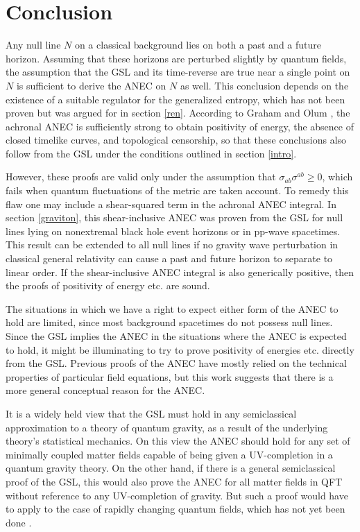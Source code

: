 \documentclass[11pt]{article}
\begin{document}
\section{Conclusion}\label{con}

Any null line $N$ on a classical background lies on both a past and a future horizon.  Assuming that these horizons are perturbed slightly by quantum fields, the assumption that the GSL and its time-reverse are true near a single point on $N$ is sufficient to derive the ANEC on $N$ as well.  This conclusion depends on the existence of a suitable regulator for the generalized entropy, which has not been proven but was argued for in section \ref{ren}.  According to Graham and Olum \cite{GO07}, the achronal ANEC is sufficiently strong to obtain positivity of energy, the absence of closed timelike curves, and topological censorship, so that these conclusions also follow from the GSL under the conditions outlined in section \ref{intro}. 

However, these proofs are valid only under the assumption that $\sigma_{ab}\sigma^{ab} \ge 0$, which fails when quantum fluctuations of the metric are taken account.  To remedy this flaw one may include a shear-squared term in the achronal ANEC integral.  In section \ref{graviton}, this shear-inclusive ANEC was proven from the GSL for null lines lying on nonextremal black hole event horizons or in pp-wave spacetimes.  This result can be extended to all null lines if no gravity wave perturbation in classical general relativity can cause a past and future horizon to separate to linear order.  If the shear-inclusive ANEC integral is also generically positive, then the proofs of positivity of energy etc. are sound.

The situations in which we have a right to expect either form of the ANEC to hold are limited, since most background spacetimes do not possess null lines.  Since the GSL implies the ANEC in the situations where the ANEC is expected to hold, it might be illuminating to try to prove positivity of energies etc. directly from the GSL.  Previous proofs of the ANEC have mostly relied on the technical properties of particular field equations, but this work suggests that there is a more general conceptual reason for the ANEC.

It is a widely held view that the GSL must hold in any semiclassical approximation to a theory of quantum gravity, as a result of the underlying theory's statistical mechanics.  On this view the ANEC should hold for any set of minimally coupled matter fields capable of being given a UV-completion in a quantum gravity theory.  On the other hand, if there is a general semiclassical proof of the GSL, this would also prove the ANEC for all matter fields in QFT without reference to any UV-completion of gravity.  But such a proof would have to apply to the case of rapidly changing quantum fields, which has not yet been done \cite{10proofs}.
\end{document}
